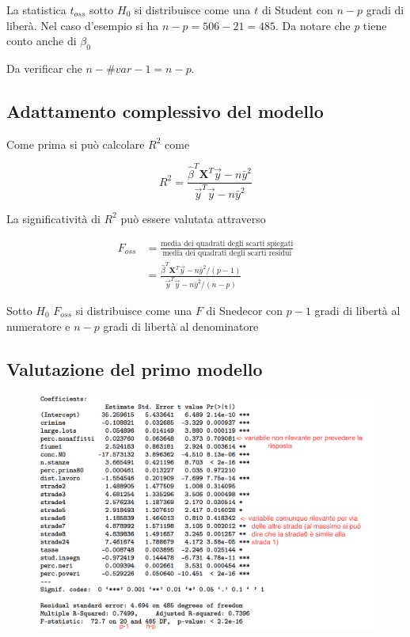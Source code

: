 La statistica $ t_{oss} $ sotto $ H_0 $ si distribuisce come una $ t $ di Student con $ n-p $ gradi di liberà.
Nel caso d'esempio si ha $ n - p = 506-21 = 485 $. Da notare che \textit{p} tiene conto anche di $ \beta_0 $

Da verificar che $ n - \#var -1 = n-p $.\\


\subsection{Adattamento complessivo del modello}

Come prima si può calcolare $ R^2 $ come

$$
R^2 = \frac{ \hat{\beta}^T \textbf{X}^T\vec{y} - n\bar{y}^2}{ \vec{y}^T\vec{y} - n\bar{y}^2 }
$$

La significatività di $R^2$ può essere valutata attraverso

\begin{align*}
F_{oss} &= \frac{\text{media dei quadrati degli scarti spiegati}}{\text{media dei quadrati degli scarti residui}}\\
			 &=  \frac{ \hat{\beta}^T \textbf{X}^T\vec{y} - n\bar{y}^2 /(p-1) }{ \vec{y}^T\vec{y} - n\bar{y}^2 /(n-p)}
\end{align*}


Sotto $ H_0 $ $ F_{oss} $ si distribuisce come una $ F $ di Snedecor con $ p-1 $ gradi di libertà al numeratore e $ n-p $ gradi di libertà al denominatore

\subsection{Valutazione del primo modello}

\begin{figure}[htbp]
	\centering
	\includegraphics[width=.7\textwidth]{./notes/immagini/l10-fig1.png}
\end{figure}

